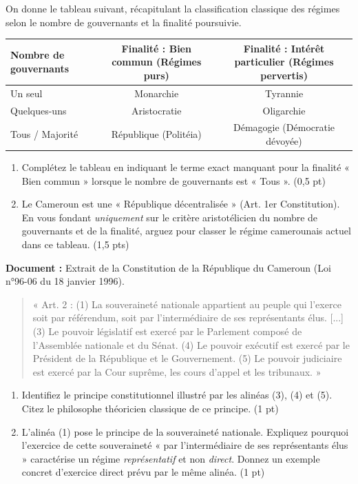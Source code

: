 \documentclass[11pt]{article}
\begin{document}
\begin{exercice}
On donne le tableau suivant, récapitulant la classification classique des régimes selon le nombre de gouvernants et la finalité poursuivie.

\begin{tabularx}{\linewidth}{|X|c|c|}
\hline
\textbf{Nombre de gouvernants} & \textbf{Finalité : Bien commun (Régimes purs)} & \textbf{Finalité : Intérêt particulier (Régimes pervertis)} \\
\hline
Un seul & Monarchie & Tyrannie \\
\hline
Quelques-uns & Aristocratie & Oligarchie \\
\hline
Tous / Majorité & République (Politéia) & Démagogie (Démocratie dévoyée) \\
\hline
\end{tabularx}

\begin{enumerate}
    \item Complétez le tableau en indiquant le terme exact manquant pour la finalité « Bien commun » lorsque le nombre de gouvernants est « Tous ». (0,5 pt)
    \item Le Cameroun est une « République décentralisée » (Art. 1er Constitution). En vous fondant \textit{uniquement} sur le critère aristotélicien du nombre de gouvernants et de la finalité, arguez pour classer le régime camerounais actuel dans ce tableau. (1,5 pts)
\end{enumerate}
\end{exercice}

\begin{exercice}
\textbf{Document :} Extrait de la Constitution de la République du Cameroun (Loi n°96-06 du 18 janvier 1996).
\begin{quote}
« Art. 2 : (1) La souveraineté nationale appartient au peuple qui l'exerce soit par référendum, soit par l'intermédiaire de ses représentants élus. [...] (3) Le pouvoir législatif est exercé par le Parlement composé de l'Assemblée nationale et du Sénat. (4) Le pouvoir exécutif est exercé par le Président de la République et le Gouvernement. (5) Le pouvoir judiciaire est exercé par la Cour suprême, les cours d'appel et les tribunaux. »
\end{quote}
\begin{enumerate}
    \item Identifiez le principe constitutionnel illustré par les alinéas (3), (4) et (5). Citez le philosophe théoricien classique de ce principe. (1 pt)
    \item L'alinéa (1) pose le principe de la souveraineté nationale. Expliquez pourquoi l'exercice de cette souveraineté « par l'intermédiaire de ses représentants élus » caractérise un régime \textit{représentatif} et non \textit{direct}. Donnez un exemple concret d'exercice direct prévu par le même alinéa. (1 pt)
\end{enumerate}
\end{exercice}
\end{document}
